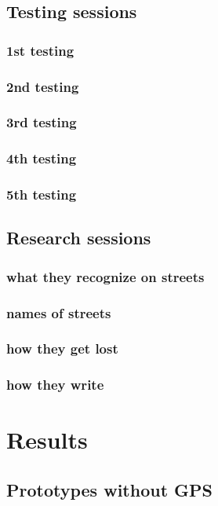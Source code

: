 \documentclass[11pt,oneside,a4paper]{book}
\begin{document}
		
						
		
		\section{Testing sessions}
			\subsection{1st testing}
				\label{sec:1th-testing}
			\subsection{2nd testing}
				\label{sec:2th-testing}
			\subsection{3rd testing}
				\label{sec:3th-testing}
			\subsection{4th testing}
				\label{sec:4th-testing}
			\subsection{5th testing}
				\label{sec:5th-testing}
		\section{Research sessions}
			\subsection{what they recognize on streets}
			\subsection{names of streets}
			\subsection{how they get lost}
			\subsection{how they write}
	
	\chapter{Results}
		\section{Prototypes without GPS}
\end{document}
